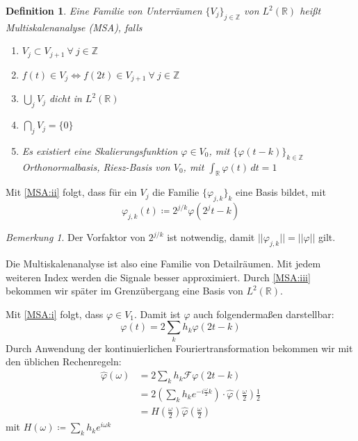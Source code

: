 \documentclass[]{scrartcl}
\theoremstyle{plain}
\newtheorem{defn}[theo]{Definition}
\theoremstyle{remark}
\newtheorem*{bem}{Bemerkung}
\newcommand{\lR}{L^2(\mathbb{R})}
\begin{document}
    \begin{defn}
        Eine Familie von Unterräumen $\{V_j\}_{j \in \mathbb{Z}}$ von $\lR$  heißt \emph{Multiskalenanalyse} (MSA), falls

        \begin{enumerate}[label=(\roman*)]
            \item $V_j \subset V_{j+1} \: \forall \: j \in \mathbb{Z}$ \label{MSA:i}
            \item $f(t) \in V_j \Leftrightarrow f(2t) \in V_{j+1} \: \forall \: j \in \mathbb{Z}$ \label{MSA:ii}
            \item $\bigcup_j V_j$ dicht in $L^2(\mathbb{R})$ \label{MSA:iii}
            \item $\bigcap_j V_j = \{ 0 \}$ 
            \item Es existiert eine Skalierungsfunktion $\varphi \in V_0$, mit $\{\varphi (t - k)\}_{k \in \mathbb{Z}}$ Orthonormalbasis, Riesz-Basis von $V_0$, mit 
            $\int_\mathbb{R} \varphi(t) \, dt = 1$ \label{MSA:v}
        \end{enumerate}
    \end{defn}

    Mit \autoref{MSA:ii} folgt, dass für ein $V_j$ die Familie $\{\varphi_{j,k}\}_k$ eine Basis bildet, mit $$\varphi_{j,k} (t) \coloneqq 2^{j/k} \varphi(2^j t - k)$$

    \begin{bem}
        Der Vorfaktor von $2^{j/k}$ ist notwendig, damit 
        $||\varphi_{j,k}|| = ||\varphi||$ gilt.
    \end{bem}

    Die Multiskalenanalyse ist also eine Familie von Detailräumen. Mit jedem weiteren Index werden die Signale besser approximiert. Durch \autoref{MSA:iii} bekommen wir später im Grenzübergang eine Basis von $\lR$.

    Mit \autoref{MSA:i} folgt, dass $\varphi \in V_1$. Damit ist $\varphi$ auch folgendermaßen darstellbar:
    $$\varphi(t) = 2 \sum_k h_k \varphi(2t - k)$$
    Durch Anwendung der kontinuierlichen Fouriertransformation bekommen wir mit den üblichen Rechenregeln:
    \begin{align*}
        \hat{\varphi}(\omega) &= 2 \sum_k h_k \mathcal{F} \varphi(2t - k) \\
                            &= 2 (\sum_k h_k e^{-i \frac{\omega}{2}k}) \cdot \hat{\varphi}(\frac{\omega}{2}) \frac{1}{2} \\
                            &= H(\frac{\omega}{2}) \hat{\varphi}(\frac{\omega}{2})
    \end{align*} mit $H(\omega) \coloneqq \sum_k h_k e^{i\omega k}$
    
\end{document}
